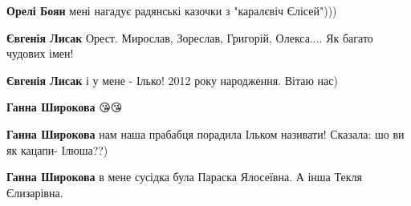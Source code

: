 \begin{itemize}
\begin{itemize}
 
\textbf{Орелі Боян} мені нагадує радянські казочки з "каралєвіч Єлісей")))

 
\textbf{Євгенія Лисак} Орест.
Мирослав, Зореслав, Григорій, Олекса....
Як багато чудових імен!

 
\textbf{Євгенія Лисак} і у мене - Ілько!
2012 року народження.
Вітаю нас)

 
\textbf{Ганна Широкова} 😘😘

 
\textbf{Ганна Широкова} нам наша прабабця порадила Ільком називати! Сказала: шо ви як кацапи- Ілюша??)

 
\textbf{Ганна Широкова} в мене сусідка була Параска Ялосеївна. А інша Текля Єлизарівна.

 

\end{itemize}
\end{itemize}
